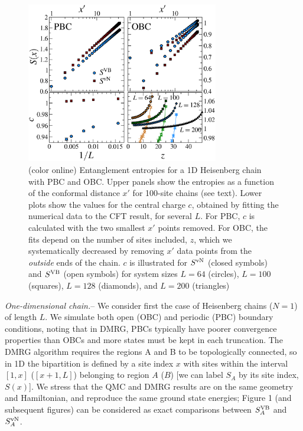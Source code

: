 \documentclass[prl,aps,twocolumn,floatfix,amsmath,amssymb,superscriptaddress,tightenlines]{revtex4}
\begin{document}
\begin{figure} {
\includegraphics[width=3.3in]{4-panelFIG1.eps} \caption{(color online) 
Entanglement entropies for a 1D Heisenberg chain with PBC and OBC. Upper panels show the entropies as a
function of the conformal distance $x'$ for 100-site chains (see text).
Lower plots show the values for the central charge $c$, obtained by
fitting the numerical data to the CFT result, for several $L$.
For PBC, $c$ is calculated with the two smallest $x'$ points removed.
For OBC, the fits depend on the number of sites included, $z$,
which we
systematically decreased by
removing $x'$ data points from the {\it outside} ends of the chain.
$c$ is illustrated for $S^{\rm vN}$ (closed symbols) and $S^{\rm VB}$ (open
symbols) for system sizes $L=64$ (circles), $L=100$ (squares), $L=128$
(diamonds), and $L=200$ (triangles) \label{1D}}} \end{figure}

{\it One-dimensional chain.}-- We consider first the case of Heisenberg
chains ($N=1$) of length $L$. We simulate both open (OBC) and periodic (PBC) boundary conditions, noting that in DMRG, PBCs typically
have poorer convergence properties than OBCs and more states must be kept
in each truncation.  The DMRG algorithm requires the regions A and B to
be topologically connected, so in 1D the bipartition is defined by a site
index $x$ with sites within the interval $[1,x]$ ($[x+1,L]$) belonging to
region $A$ ($B$) [we can label $S_A$ by its site index, $S(x)$].
We stress that the QMC and DMRG results are on the same geometry and
Hamiltonian, and reproduce the same ground state energies; Figure 1 (and subsequent figures) can be considered as exact comparisons between $S^{\rm VB}_A$ and $S^{ \rm vN}_A$.
\end{document}

